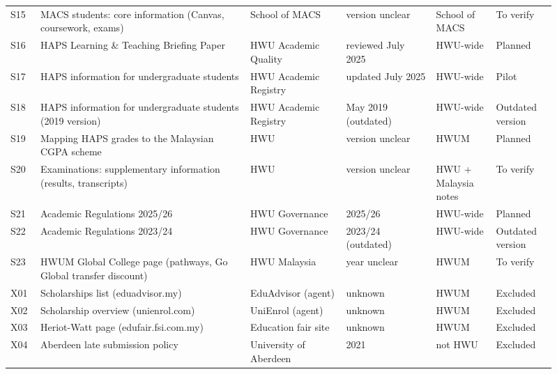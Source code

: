 \begin{minipage}{15.29cm}
\begin{tabular}{L{0.05\linewidth}L{0.35\linewidth}L{0.165\linewidth}L{0.15\linewidth}L{0.1\linewidth}L{0.1\linewidth}}
S15 & MACS students: core information (Canvas, coursework, exams) & School of MACS & version unclear & School of MACS & To verify \\
S16 & HAPS Learning \& Teaching Briefing Paper & HWU Academic Quality & reviewed July 2025 & HWU-wide & Planned \\
S17 & HAPS information for undergraduate students & HWU Academic Registry & updated July 2025 & HWU-wide & Pilot \\
S18 & HAPS information for undergraduate students (2019 version) & HWU Academic Registry & May 2019 (outdated) & HWU-wide & Outdated version \\
S19 & Mapping HAPS grades to the Malaysian CGPA scheme & HWU & version unclear & HWUM & Planned \\
S20 & Examinations: supplementary information (results, transcripts) & HWU & version unclear & HWU + Malaysia notes & To verify \\
S21 & Academic Regulations 2025/26 & HWU Governance & 2025/26 & HWU-wide & Planned \\
S22 & Academic Regulations 2023/24 & HWU Governance & 2023/24 (outdated) & HWU-wide & Outdated version \\
S23 & HWUM Global College page (pathways, Go Global transfer discount) & HWU Malaysia & year unclear & HWUM & To verify \\
X01 & Scholarships list (eduadvisor.my) & EduAdvisor (agent) & unknown & HWUM & Excluded \\
X02 & Scholarship overview (unienrol.com) & UniEnrol (agent) & unknown & HWUM & Excluded \\
X03 & Heriot-Watt page (edufair.fsi.com.my) & Education fair site & unknown & HWUM & Excluded \\
X04 & Aberdeen late submission policy & University of Aberdeen & 2021 & not HWU & Excluded \\
\bottomrule
\end{tabular}
\end{minipage}

